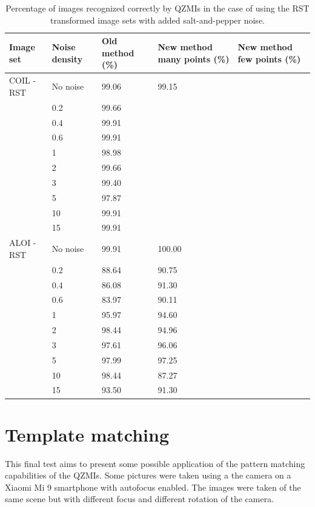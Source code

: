 \begin{table}
    \centering
    \begin{tabular}{|p{2.15cm}|p{1.8cm}|p{3cm}|p{2.74cm}|p{2.6cm}|} \hline
        \textbf{Image set} & \textbf{Noise density} & \textbf{Old method} (\%) & \textbf{New method} many points (\%)& \textbf{New method} few points (\%) \\ \hline\hline
        COIL - RST & No noise & 99.06 & 99.15 & \\ \cline{2-5}
        & 0.2 & 99.66 &  &  \\ \cline{2-5}
        & 0.4 & 99.91 &  &  \\ \cline{2-5}
        & 0.6 & 99.91 &  &  \\ \cline{2-5}
        & 1 & 98.98 &  &  \\ \cline{2-5}
        & 2 & 99.66 &  &  \\ \cline{2-5}
        & 3 & 99.40 &  &  \\ \cline{2-5}
        & 5 & 97.87 &  &  \\ \cline{2-5}
        & 10 & 99.91 &  &  \\ \cline{2-5}
        & 15 & 99.91 &  &  \\ \cline{1-5}
        ALOI - RST & No noise & 99.91 & 100.00 & \\ \cline{2-5}
        & 0.2 & 88.64 & 90.75 &  \\ \cline{2-5}
        & 0.4 & 86.08 & 91.30 &  \\ \cline{2-5}
        & 0.6 & 83.97 & 90.11 &  \\ \cline{2-5}
        & 1 & 95.97 & 94.60 &  \\ \cline{2-5}
        & 2 & 98.44 & 94.96 &  \\ \cline{2-5}
        & 3 & 97.61 & 96.06 &  \\ \cline{2-5}
        & 5 & 97.99 & 97.25 &  \\ \cline{2-5}
        & 10 & 98.44 & 87.27 &  \\ \cline{2-5}
        & 15 & 93.50 & 91.30 &  \\ \cline{1-5}
    \end{tabular}
    \caption{Percentage of images recognized correctly by QZMIs in the case of using the RST transformed image sets with added salt-and-pepper noise.}
    \label{tab:recognition_salt}
\end{table}

\section{Template matching}
This final test aims to present some possible application of the pattern matching capabilities of the QZMIs. Some pictures were taken using a the camera on a Xiaomi Mi 9 smartphone with autofocus enabled. The images were taken of the same scene but with different focus and different rotation of the camera.

